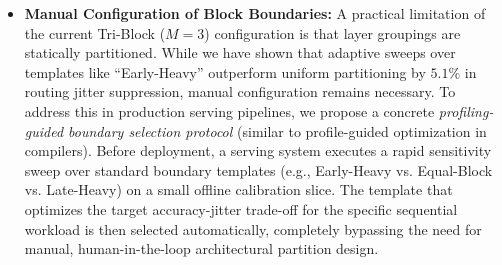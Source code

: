 \begin{itemize}
    \item \textbf{Manual Configuration of Block Boundaries:} A practical limitation of the current Tri-Block ($M=3$) configuration is that layer groupings are statically partitioned. While we have shown that adaptive sweeps over templates like ``Early-Heavy'' outperform uniform partitioning by $5.1\%$ in routing jitter suppression, manual configuration remains necessary. To address this in production serving pipelines, we propose a concrete \emph{profiling-guided boundary selection protocol} (similar to profile-guided optimization in compilers). Before deployment, a serving system executes a rapid sensitivity sweep over standard boundary templates (e.g., Early-Heavy vs. Equal-Block vs. Late-Heavy) on a small offline calibration slice. The template that optimizes the target accuracy-jitter trade-off for the specific sequential workload is then selected automatically, completely bypassing the need for manual, human-in-the-loop architectural partition design.
\end{itemize}
